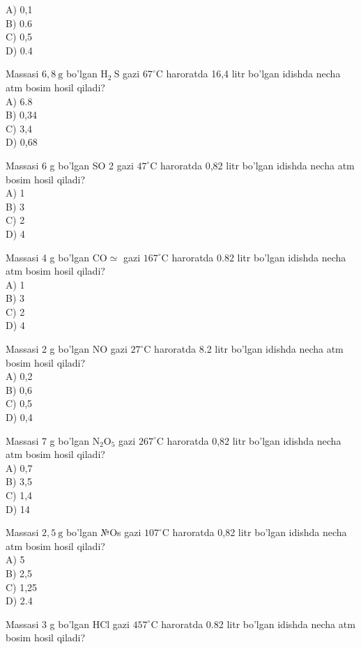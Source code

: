 A) 0,1\\
B) 0.6\\
C) 0,5\\
D) 0.4
  \item Massasi $6,8 \mathrm{~g}$ bo'lgan $\mathrm{H}_{2} \mathrm{~S}$ gazi $67^{\circ} \mathrm{C}$ haroratda 16,4 litr bo'lgan idishda necha atm bosim hosil qiladi?\\
A) 6.8\\
B) 0,34\\
C) 3,4\\
D) 0,68
  \item Massasi 6 g bo'lgan SO 2 gazi $47^{\circ} \mathrm{C}$ haroratda 0,82 litr bo'lgan idishda necha atm bosim hosil qiladi?\\
A) 1\\
B) 3\\
C) 2\\
D) 4
  \item Massasi 4 g bo'lgan $\mathrm{CO} \simeq$ gazi $167^{\circ} \mathrm{C}$ haroratda 0.82 litr bo'lgan idishda necha atm bosim hosil qiladi?\\
A) 1\\
B) 3\\
C) 2\\
D) 4
  \item Massasi 2 g bo'lgan NO gazi $27^{\circ} \mathrm{C}$ haroratda 8.2 litr bo'lgan idishda necha atm bosim hosil qiladi?\\
A) 0,2\\
B) 0,6\\
C) 0,5\\
D) 0,4
  \item Massasi 7 g bo'lgan $\mathrm{N}_{2} \mathrm{O}_{5}$ gazi $267^{\circ} \mathrm{C}$ haroratda 0,82 litr bo'lgan idishda necha atm bosim hosil qiladi?\\
A) 0,7\\
B) 3,5\\
C) 1,4\\
D) 14
  \item Massasi $2,5 \mathrm{~g}$ bo'lgan №Os gazi $107^{\circ} \mathrm{C}$ haroratda 0,82 litr bo'lgan idishda necha atm bosim hosil qiladi?\\
A) 5\\
B) 2,5\\
C) 1,25\\
D) 2.4
  \item Massasi 3 g bo'lgan HCl gazi $457^{\circ} \mathrm{C}$ haroratda 0.82 litr bo'lgan idishda necha atm bosim hosil qiladi?\\

